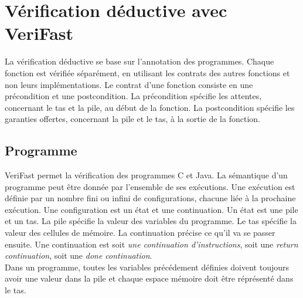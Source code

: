 \documentclass[11pt,openany]{article}
\newcommand{\verifast}{VeriFast}
\begin{document}
\section{V\'erification d\'eductive avec \verifast{}}
	La v\'erification d\'eductive se base sur l'annotation des programmes. Chaque fonction est v\'erifi\'ee s\'epar\'ement, en utilisant les contrats des autres fonctions et non leurs impl\'ementations. Le contrat d'une fonction consiste en une pr\'econdition et une postcondition. La pr\'econdition sp\'ecifie les attentes, concernant le tas et la pile, au d\'ebut de la fonction. La postcondition sp\'ecifie les garanties offertes, concernant la pile et le tas, \`a la sortie de la fonction.
	\subsection{Programme}
		\verifast{} permet la v\'erification des programmes C et Java. La s\'emantique d'un programme peut \^etre donn\'ee par l'ensemble de ses ex\'ecutions. Une ex\'ecution est d\'efinie par un nombre fini ou infini de configurations, chacune li\'ee \`a la prochaine ex\'ecution. Une configuration est un \'etat et une continuation. Un \'etat est une pile et un tas. La pile sp\'ecifie la valeur des variables du programme. Le tas sp\'ecifie la valeur des cellules de m\'emoire. La continuation pr\'ecise ce qu'il va se passer ensuite. Une continuation est soit \textit{une continuation d'instructions}, soit une \textit{return continuation}, soit une \textit{done continuation}.\\
	Dans un programme, toutes les variables pr\'ec\'edement d\'efinies doivent toujours avoir une valeur dans la pile et chaque espace m\'emoire doit \^etre r\'epr\'esent\'e dans le tas.
\end{document}
